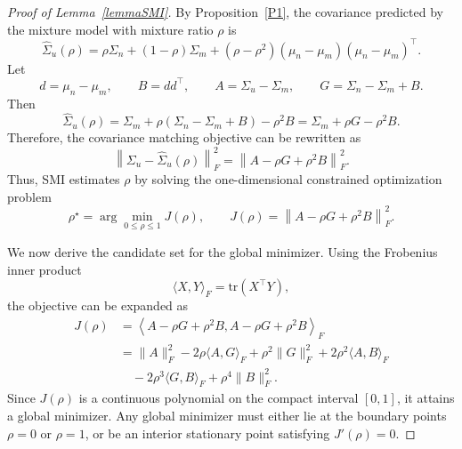 \documentclass{article}
\theoremstyle{plain}
\theoremstyle{definition}
\theoremstyle{remark}
\begin{document}
\begin{proof}[Proof of Lemma~\ref{lemmaSMI}]
By Proposition~\ref{P1}, the covariance predicted by the mixture model with mixture ratio $\rho$ is
\begin{equation}
\widehat{\Sigma}_u(\rho)
=
\rho \Sigma_n+(1-\rho)\Sigma_m
+
(\rho-\rho^2)(\mu_n-\mu_m)(\mu_n-\mu_m)^\top.
\end{equation}
Let
\begin{equation}
d=\mu_n-\mu_m,
\qquad
B=dd^\top,
\qquad
A=\Sigma_u-\Sigma_m,
\qquad
G=\Sigma_n-\Sigma_m+B.
\end{equation}
Then
\begin{equation}
\widehat{\Sigma}_u(\rho)
=
\Sigma_m+\rho(\Sigma_n-\Sigma_m+B)-\rho^2B
=
\Sigma_m+\rho G-\rho^2B.
\end{equation}
Therefore, the covariance matching objective can be rewritten as
\begin{equation}
\left\|
\Sigma_u-\widehat{\Sigma}_u(\rho)
\right\|_F^2
=
\left\|
A-\rho G+\rho^2B
\right\|_F^2.
\end{equation}
Thus, SMI estimates $\rho$ by solving the one-dimensional constrained optimization problem
\begin{equation}
\rho^\star
=
\arg\min_{0\le \rho\le 1}
J(\rho),
\qquad
J(\rho)
=
\left\|
A-\rho G+\rho^2B
\right\|_F^2.
\end{equation}

We now derive the candidate set for the global minimizer. Using the Frobenius inner product
\begin{equation}
\langle X,Y\rangle_F=\mathrm{tr}(X^\top Y),
\end{equation}
the objective can be expanded as
\begin{equation}
\begin{aligned}
J(\rho)
&=
\left\langle A-\rho G+\rho^2B,
A-\rho G+\rho^2B
\right\rangle_F \\
&=
\|A\|_F^2
-2\rho\langle A,G\rangle_F
+\rho^2\|G\|_F^2
+2\rho^2\langle A,B\rangle_F \\
&\quad
-2\rho^3\langle G,B\rangle_F
+\rho^4\|B\|_F^2 .
\end{aligned}
\end{equation}
Since $J(\rho)$ is a continuous polynomial on the compact interval $[0,1]$, it attains a global minimizer. Any global minimizer must either lie at the boundary points $\rho=0$ or $\rho=1$, or be an interior stationary point satisfying $J'(\rho)=0$.


\end{proof}
\end{document}
